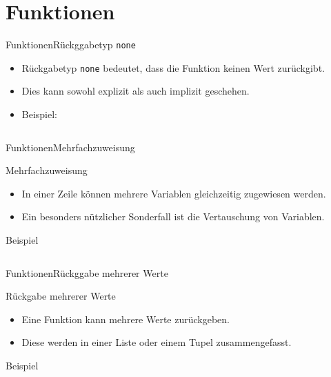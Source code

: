 \documentclass[xelatex,aspectratio=169]{beamer}
\begin{document}
\section{Funktionen}

\begin{frame}{Funktionen}{Rückggabetyp \texttt{none}}
    \begin{itemize}
        \item Rückgabetyp \texttt{none} bedeutet, dass die Funktion keinen Wert zurückgibt.
        \item Dies kann sowohl explizit als auch implizit geschehen.
        \item Beispiel:
              \inputminted{python}{src/functions_return_none.py}
    \end{itemize}
\end{frame}

\begin{frame}{Funktionen}{Mehrfachzuweisung}
    \begin{block}{Mehrfachzuweisung}
        \begin{itemize}
            \item In einer Zeile können mehrere Variablen gleichzeitig zugewiesen werden.
            \item Ein besonders nützlicher Sonderfall ist die Vertauschung von Variablen.
        \end{itemize}
    \end{block}
    \begin{exampleblock}
        {Beispiel}
        \inputminted[firstline=6]{python}{src/functions_multi_asign.py}
    \end{exampleblock}
\end{frame}

\begin{frame}{Funktionen}{Rückggabe mehrerer Werte}
    \vspace{-.3cm}
    \begin{block}{Rückgabe mehrerer Werte}
        \begin{itemize}
            \item Eine Funktion kann mehrere Werte zurückgeben.
            \item Diese werden in einer Liste oder einem Tupel zusammengefasst.
        \end{itemize}
    \end{block}
    \begin{exampleblock}
        {Beispiel}
        \inputminted[firstline=4, lastline=12]{python}{src/functions_multi_return.py}
    \end{exampleblock}

\end{frame}
\end{document}
